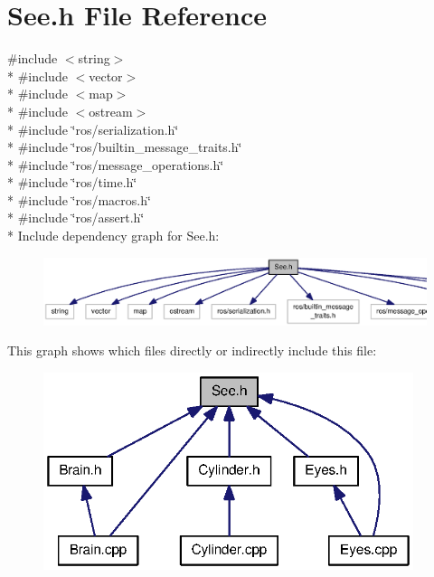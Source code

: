 \section{See.\-h File Reference}
\label{See_8h}
{\ttfamily \#include $<$string$>$}\\*
{\ttfamily \#include $<$vector$>$}\\*
{\ttfamily \#include $<$map$>$}\\*
{\ttfamily \#include $<$ostream$>$}\\*
{\ttfamily \#include \char`\"{}ros/serialization.\-h\char`\"{}}\\*
{\ttfamily \#include \char`\"{}ros/builtin\-\_\-message\-\_\-traits.\-h\char`\"{}}\\*
{\ttfamily \#include \char`\"{}ros/message\-\_\-operations.\-h\char`\"{}}\\*
{\ttfamily \#include \char`\"{}ros/time.\-h\char`\"{}}\\*
{\ttfamily \#include \char`\"{}ros/macros.\-h\char`\"{}}\\*
{\ttfamily \#include \char`\"{}ros/assert.\-h\char`\"{}}\\*
Include dependency graph for See.\-h\-:
\nopagebreak
\begin{figure}[H]
\begin{center}
\leavevmode
\includegraphics[width=350pt]{See_8h__incl}
\end{center}
\end{figure}
This graph shows which files directly or indirectly include this file\-:
\nopagebreak
\begin{figure}[H]
\begin{center}
\leavevmode
\includegraphics[width=307pt]{See_8h__dep__incl}
\end{center}
\end{figure}
